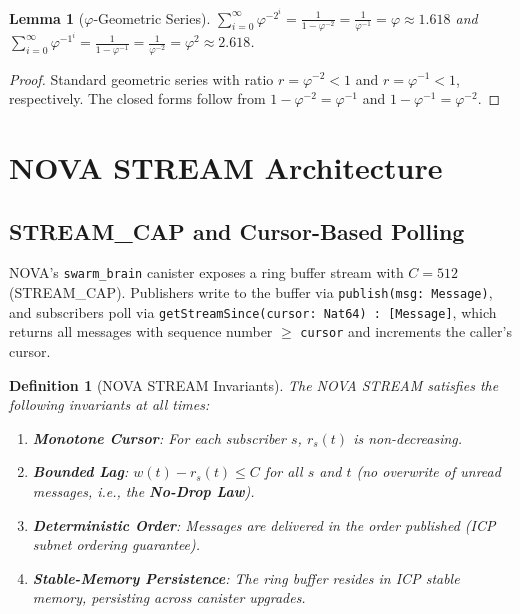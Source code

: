 \documentclass[12pt]{article}
\newtheorem{lemma}[theorem]{Lemma}
\newtheorem{definition}[theorem]{Definition}
\newcommand{\PHI}{\varphi}
\newcommand{\PHIINV}{\varphi^{-1}}
\newcommand{\AMOR}{\varphi^{-2}}
\newcommand{\SCAP}{C}
\newcommand{\NoDrop}{\textbf{No-Drop Law}}
\begin{document}
\begin{lemma}[$\varphi$-Geometric Series]
\label{lem:geo}
$\displaystyle\sum_{i=0}^{\infty} \AMOR^i = \frac{1}{1 - \AMOR} = \frac{1}{\PHIINV}
= \PHI \approx 1.618$ and $\displaystyle\sum_{i=0}^{\infty} \PHIINV^i =
\frac{1}{1-\PHIINV} = \frac{1}{\AMOR} = \PHI^2 \approx 2.618$.
\end{lemma}

\begin{proof}
Standard geometric series with ratio $r = \AMOR < 1$ and $r = \PHIINV < 1$,
respectively.  The closed forms follow from $1 - \AMOR = \PHIINV$ and $1 -
\PHIINV = \AMOR$.
\end{proof}

\section{NOVA STREAM Architecture}
\label{sec:nova}

\subsection{STREAM\_CAP and Cursor-Based Polling}

NOVA's \texttt{swarm\_brain} canister exposes a ring buffer stream with
$\SCAP = 512$ (STREAM\_CAP).  Publishers write to the buffer via
\texttt{publish(msg: Message)}, and subscribers poll via
\texttt{getStreamSince(cursor: Nat64) : [Message]}, which returns all messages
with sequence number $\ge$ \texttt{cursor} and increments the caller's cursor.

\begin{definition}[NOVA STREAM Invariants]
\label{def:stream-invariants}
The NOVA STREAM satisfies the following invariants at all times:
\begin{enumerate}[label=(I\arabic*)]
  \item \textbf{Monotone Cursor}: For each subscriber $s$, $r_s(t)$ is
        non-decreasing.
  \item \textbf{Bounded Lag}: $w(t) - r_s(t) \le \SCAP$ for all $s$ and $t$
        (no overwrite of unread messages, i.e., the \NoDrop{}).
  \item \textbf{Deterministic Order}: Messages are delivered in the order
        published (ICP subnet ordering guarantee).
  \item \textbf{Stable-Memory Persistence}: The ring buffer resides in ICP
        stable memory, persisting across canister upgrades.
\end{enumerate}
\end{definition}
\end{document}
